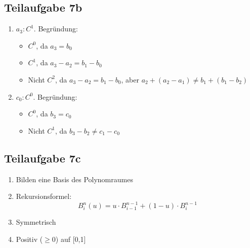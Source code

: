 \documentclass[a4paper]{scrartcl}
\begin{document}
\subsection*{Teilaufgabe 7b}

\begin{enumerate}[label=(\Roman*)]
    \item $a_3: C^1$. Begründung:
          \begin{itemize}
              \item $C^0$, da $a_3 = b_0$
              \item $C^1$, da $a_3 - a_2 = b_1 - b_0$
              \item Nicht $C^2$, da $a_3 - a_2 = b_1 - b_0$, aber $a_2 + (a_2-a_1) \neq b_1 + (b_1 - b_2)$
          \end{itemize}
    \item $c_0: C^0$. Begründung:
          \begin{itemize}
              \item $C^0$, da $b_3 = c_0$
              \item Nicht $C^1$, da $b_3-b_2 \neq c_1 - c_0$
          \end{itemize}
\end{enumerate}

\subsection*{Teilaufgabe 7c}
\begin{enumerate}
    \item Bilden eine Basis des Polynomraumes
    \item Rekursionsformel: \[B^n_i(u) = u \cdot B^{n-1}_{i-1} + (1-u) \cdot B^{n-1}_{i} \]
    \item Symmetrisch
    \item Positiv ($\geq 0$) auf [0,1]
\end{enumerate}
\end{document}
